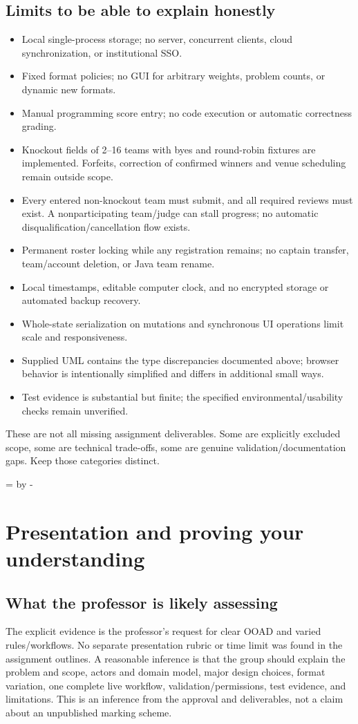 \documentclass[12pt]{article}
\newcommand{\topic}[1]{\needroom{9\baselineskip}\section{#1}}
\newcommand{\needroom}[1]{\par\begingroup\dimen0=\pagegoal\advance\dimen0 by -\pagetotal\ifdim\dimen0<#1\newpage\fi\endgroup}
\begin{document}
\subsection{Limits to be able to explain honestly}
\begin{itemize}
\item Local single-process storage; no server, concurrent clients, cloud synchronization, or institutional SSO.
\item Fixed format policies; no GUI for arbitrary weights, problem counts, or dynamic new formats.
\item Manual programming score entry; no code execution or automatic correctness grading.
\item Knockout fields of 2--16 teams with byes and round-robin fixtures are implemented. Forfeits, correction of confirmed winners and venue scheduling remain outside scope.
\item Every entered non-knockout team must submit, and all required reviews must exist. A nonparticipating team/judge can stall progress; no automatic disqualification/cancellation flow exists.
\item Permanent roster locking while any registration remains; no captain transfer, team/account deletion, or Java team rename.
\item Local timestamps, editable computer clock, and no encrypted storage or automated backup recovery.
\item Whole-state serialization on mutations and synchronous UI operations limit scale and responsiveness.
\item Supplied UML contains the type discrepancies documented above; browser behavior is intentionally simplified and differs in additional small ways.
\item Test evidence is substantial but finite; the specified environmental/usability checks remain unverified.
\end{itemize}
These are not all missing assignment deliverables. Some are explicitly excluded scope, some are technical trade-offs, some are genuine validation/documentation gaps. Keep those categories distinct.

\topic{Presentation and proving your understanding}
\subsection{What the professor is likely assessing}
The explicit evidence is the professor's request for clear OOAD and varied rules/workflows. No separate presentation rubric or time limit was found in the assignment outlines. A reasonable inference is that the group should explain the problem and scope, actors and domain model, major design choices, format variation, one complete live workflow, validation/permissions, test evidence, and limitations. This is an inference from the approval and deliverables, not a claim about an unpublished marking scheme.
\end{document}
